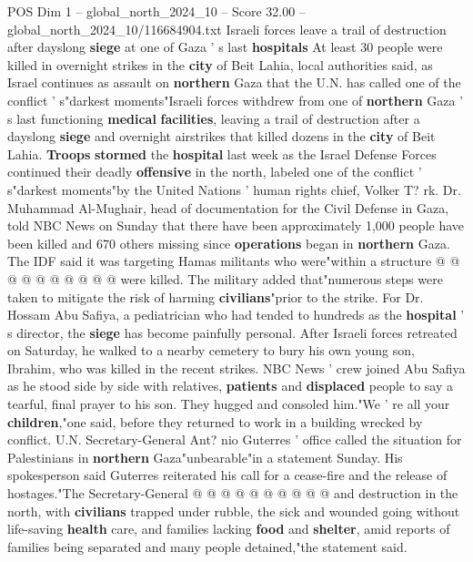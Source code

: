 \begin{textsample}{POS Dim 1 – global\_north\_2024\_10 – Score 32.00 – global\_north\_2024\_10/116684904.txt}  \label{ex:f1_pos_376}
Israeli forces leave a trail of destruction after dayslong \textbf{siege} at one of Gaza ' s last \textbf{hospitals} At least 30 people were killed in overnight strikes in the \textbf{city} of Beit Lahia, local authorities said, as Israel continues as assault on \textbf{northern} Gaza that the U.N. has called one of the conflict ' s"darkest moments"Israeli forces withdrew from one of \textbf{northern} Gaza ' s last functioning \textbf{medical} \textbf{facilities}, leaving a trail of destruction after a dayslong \textbf{siege} and overnight airstrikes that killed dozens in the \textbf{city} of Beit Lahia. \textbf{Troops} \textbf{stormed} the \textbf{hospital} last week as the Israel Defense Forces continued their deadly \textbf{offensive} in the north, labeled one of the conflict ' s"darkest moments"by the United Nations ' human rights chief, Volker T? rk.
Dr.
Muhammad Al-Mughair, head of documentation for the Civil Defense in Gaza, told NBC News on Sunday that there have been approximately 1,000 people have been killed and 670 others missing since \textbf{operations} began in \textbf{northern} Gaza.
The IDF said it was targeting Hamas militants who were"within a structure @ @ @ @ @ @ @ @ @ @ were killed.
The military added that"numerous steps were taken to mitigate the risk of harming \textbf{civilians}"prior to the strike.
For Dr.
Hossam Abu Safiya, a pediatrician who had tended to hundreds as the \textbf{hospital} ' s director, the \textbf{siege} has become painfully personal.
After Israeli forces retreated on Saturday, he walked to a nearby cemetery to bury his own young son, Ibrahim, who was killed in the recent strikes.
NBC News ' crew joined Abu Safiya as he stood side by side with relatives, \textbf{patients} and \textbf{displaced} people to say a tearful, final prayer to his son.
They hugged and consoled him."We ' re all your \textbf{children},"one said, before they returned to work in a building wrecked by conflict.
U.N.
Secretary-General Ant? nio Guterres ' office called the situation for Palestinians in \textbf{northern} Gaza"unbearable"in a statement Sunday.
His spokesperson said Guterres reiterated his call for a cease-fire and the release of hostages."The Secretary-General @ @ @ @ @ @ @ @ @ @ and destruction in the north, with \textbf{civilians} trapped under rubble, the sick and wounded going without life-saving \textbf{health} care, and families lacking \textbf{food} and \textbf{shelter}, amid reports of families being separated and many people detained,"the statement said.

\end{textsample}
